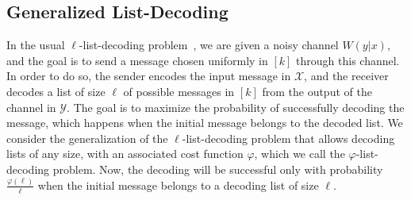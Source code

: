 \subsection{Generalized List-Decoding}
\label{subsection:generalized-list-decoding}

In the usual $\ell$-list-decoding problem~\cite{Elias57,Wozencraft58}, we are given a noisy channel $W(y|x)$, and the goal is to send a message chosen uniformly in $[k]$ through this channel. In order to do so, the sender encodes the input message in $\mathcal{X}$, and the receiver decodes a list of size $\ell$ of possible messages in $[k]$ from the output of the channel in $\mathcal{Y}$. The goal is to maximize the probability of successfully decoding the message, which happens when the initial message belongs to the decoded list. We consider the generalization of the $\ell$-list-decoding problem that allows decoding lists of any size, with an associated cost function $\varphi$, which we call the $\varphi$-list-decoding problem. Now, the decoding will be successful only with probability $\frac{\varphi(\ell)}{\ell}$ when the initial message belongs to a decoding list of size $\ell$. 

